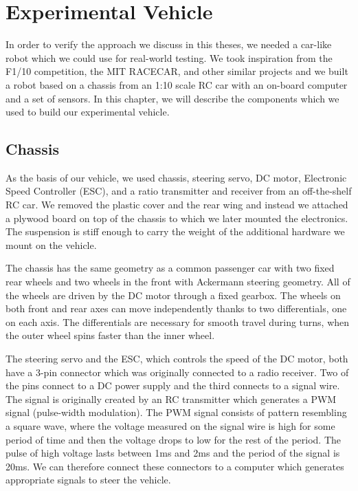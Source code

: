 \chapter{Experimental Vehicle}

In order to verify the approach we discuss in this theses, we needed a car-like robot which we could use for real-world testing. We took inspiration from the F1/10 competition, the MIT RACECAR, and other similar projects and we built a robot based on a chassis from an 1:10 scale RC car with an on-board computer and a set of sensors. In this chapter, we will describe the components which we used to build our experimental vehicle.

\section{Chassis}

As the basis of our vehicle, we used chassis, steering servo, DC motor, Electronic Speed Controller (ESC), and a ratio transmitter and receiver from an off-the-shelf RC car. We removed the plastic cover and the rear wing and instead we attached a plywood board on top of the chassis to which we later mounted the electronics. The suspension is stiff enough to carry the weight of the additional hardware we mount on the vehicle.

The chassis has the same geometry as a common passenger car with two fixed rear wheels and two wheels in the front with Ackermann steering geometry. All of the wheels are driven by the DC motor through a fixed gearbox. The wheels on both front and rear axes can move independently thanks to two differentials, one on each axis. The differentials are necessary for smooth travel during turns, when the outer wheel spins faster than the inner wheel.

The steering servo and the ESC, which controls the speed of the DC motor, both have a 3-pin connector which was originally connected to a radio receiver. Two of the pins connect to a DC power supply and the third connects to a signal wire. The signal is originally created by an RC transmitter which generates a PWM signal (pulse-width modulation). The PWM signal consists of pattern resembling a square wave, where the voltage measured on the signal wire is high for some period of time and then the voltage drops to low for the rest of the period. The pulse of high voltage lasts between \si{1}{ms} and \si{2}{ms} and the period of the signal is \si{20}{ms}. We can therefore connect these connectors to a computer which generates appropriate signals to steer the vehicle.

